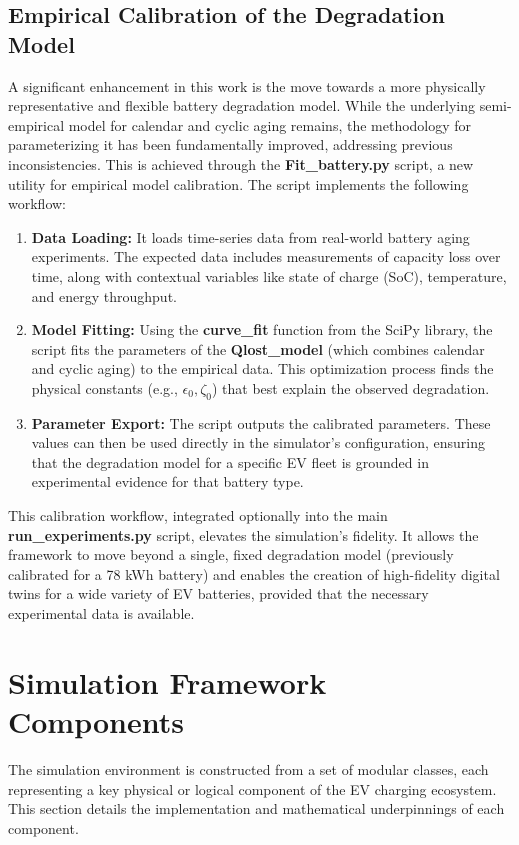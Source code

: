 \subsection{Empirical Calibration of the Degradation Model}
A significant enhancement in this work is the move towards a more physically representative and flexible battery degradation model. While the underlying semi-empirical model for calendar and cyclic aging remains, the methodology for parameterizing it has been fundamentally improved, addressing previous inconsistencies.
\noindent
This is achieved through the \textbf{Fit\_battery.py} script, a new utility for empirical model calibration. The script implements the following workflow:
\begin{enumerate}
    \item \textbf{Data Loading:} It loads time-series data from real-world battery aging experiments. The expected data includes measurements of capacity loss over time, along with contextual variables like state of charge (SoC), temperature, and energy throughput.
    \item \textbf{Model Fitting:} Using the \textbf{curve\_fit} function from the SciPy library, the script fits the parameters of the \textbf{Qlost\_model} (which combines calendar and cyclic aging) to the empirical data. This optimization process finds the physical constants (e.g., $\epsilon_0, \zeta_0$) that best explain the observed degradation.
    \item \textbf{Parameter Export:} The script outputs the calibrated parameters. These values can then be used directly in the simulator's configuration, ensuring that the degradation model for a specific EV fleet is grounded in experimental evidence for that battery type.
\end{enumerate}
\noindent
This calibration workflow, integrated optionally into the main \textbf{run\_experiments.py} script, elevates the simulation's fidelity. It allows the framework to move beyond a single, fixed degradation model (previously calibrated for a 78 kWh battery) and enables the creation of high-fidelity digital twins for a wide variety of EV batteries, provided that the necessary experimental data is available.


\section{Simulation Framework Components}
The simulation environment is constructed from a set of modular classes, each representing a key physical or logical component of the EV charging ecosystem. This section details the implementation and mathematical underpinnings of each component.

